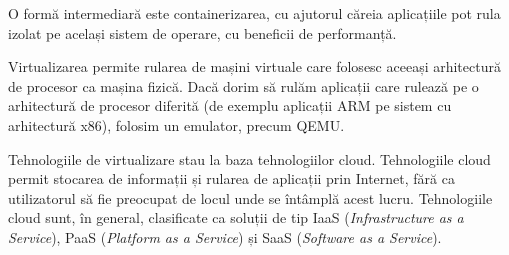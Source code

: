 O formă intermediară este containerizarea, cu ajutorul căreia aplicațiile pot rula izolat pe același sistem de operare, cu beneficii de performanță.

Virtualizarea permite rularea de mașini virtuale care folosesc aceeași arhitectură de procesor ca mașina fizică.
Dacă dorim să rulăm aplicații care rulează pe o arhitectură de procesor diferită (de exemplu aplicații ARM pe sistem cu arhitectură x86), folosim un emulator, precum QEMU.

Tehnologiile de virtualizare stau la baza tehnologiilor cloud.
Tehnologiile cloud permit stocarea de informații și rularea de aplicații prin Internet, fără ca utilizatorul să fie preocupat de locul unde se întâmplă acest lucru.
Tehnologiile cloud sunt, în general, clasificate ca soluții de tip IaaS (\textit{Infrastructure as a Service}), PaaS (\textit{Platform as a Service}) și SaaS (\textit{Software as a Service}).
